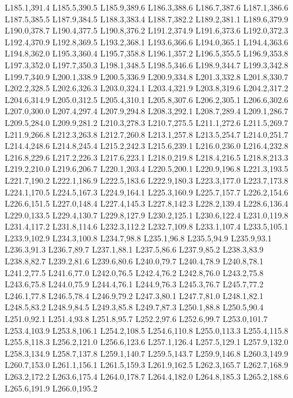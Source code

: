 		L185.1,391.4 L185.5,390.5 L185.9,389.6 L186.3,388.6 L186.7,387.6 L187.1,386.6 L187.5,385.5 L187.9,384.5
		L188.3,383.4 L188.7,382.2 L189.2,381.1 L189.6,379.9 L190.0,378.7 L190.4,377.5 L190.8,376.2 L191.2,374.9
		L191.6,373.6 L192.0,372.3 L192.4,370.9 L192.8,369.5 L193.2,368.1 L193.6,366.6 L194.0,365.1 L194.4,363.6
		L194.8,362.0 L195.3,360.4 L195.7,358.8 L196.1,357.2 L196.5,355.5 L196.9,353.8 L197.3,352.0 L197.7,350.3
		L198.1,348.5 L198.5,346.6 L198.9,344.7 L199.3,342.8 L199.7,340.9 L200.1,338.9 L200.5,336.9 L200.9,334.8
		L201.3,332.8 L201.8,330.7 L202.2,328.5 L202.6,326.3 L203.0,324.1 L203.4,321.9 L203.8,319.6 L204.2,317.2
		L204.6,314.9 L205.0,312.5 L205.4,310.1 L205.8,307.6 L206.2,305.1 L206.6,302.6 L207.0,300.0 L207.4,297.4
		L207.9,294.8 L208.3,292.1 L208.7,289.4 L209.1,286.7 L209.5,284.0 L209.9,281.2 L210.3,278.3 L210.7,275.5
		L211.1,272.6 L211.5,269.7 L211.9,266.8 L212.3,263.8 L212.7,260.8 L213.1,257.8 L213.5,254.7 L214.0,251.7
		L214.4,248.6 L214.8,245.4 L215.2,242.3 L215.6,239.1 L216.0,236.0 L216.4,232.8 L216.8,229.6 L217.2,226.3
		L217.6,223.1 L218.0,219.8 L218.4,216.5 L218.8,213.3 L219.2,210.0 L219.6,206.7 L220.1,203.4 L220.5,200.1
		L220.9,196.8 L221.3,193.5 L221.7,190.2 L222.1,186.9 L222.5,183.6 L222.9,180.3 L223.3,177.0 L223.7,173.8
		L224.1,170.5 L224.5,167.3 L224.9,164.1 L225.3,160.9 L225.7,157.7 L226.2,154.6 L226.6,151.5 L227.0,148.4
		L227.4,145.3 L227.8,142.3 L228.2,139.4 L228.6,136.4 L229.0,133.5 L229.4,130.7 L229.8,127.9 L230.2,125.1
		L230.6,122.4 L231.0,119.8 L231.4,117.2 L231.8,114.6 L232.3,112.2 L232.7,109.8 L233.1,107.4 L233.5,105.1
		L233.9,102.9 L234.3,100.8 L234.7,98.8 L235.1,96.8 L235.5,94.9 L235.9,93.1 L236.3,91.3 L236.7,89.7
		L237.1,88.1 L237.5,86.6 L237.9,85.2 L238.3,83.9 L238.8,82.7 L239.2,81.6 L239.6,80.6 L240.0,79.7
		L240.4,78.9 L240.8,78.1 L241.2,77.5 L241.6,77.0 L242.0,76.5 L242.4,76.2 L242.8,76.0 L243.2,75.8
		L243.6,75.8 L244.0,75.9 L244.4,76.1 L244.9,76.3 L245.3,76.7 L245.7,77.2 L246.1,77.8 L246.5,78.4
		L246.9,79.2 L247.3,80.1 L247.7,81.0 L248.1,82.1 L248.5,83.2 L248.9,84.5 L249.3,85.8 L249.7,87.3
		L250.1,88.8 L250.5,90.4 L251.0,92.1 L251.4,93.8 L251.8,95.7 L252.2,97.6 L252.6,99.7 L253.0,101.7
		L253.4,103.9 L253.8,106.1 L254.2,108.5 L254.6,110.8 L255.0,113.3 L255.4,115.8 L255.8,118.3 L256.2,121.0
		L256.6,123.6 L257.1,126.4 L257.5,129.1 L257.9,132.0 L258.3,134.9 L258.7,137.8 L259.1,140.7 L259.5,143.7
		L259.9,146.8 L260.3,149.9 L260.7,153.0 L261.1,156.1 L261.5,159.3 L261.9,162.5 L262.3,165.7 L262.7,168.9
		L263.2,172.2 L263.6,175.4 L264.0,178.7 L264.4,182.0 L264.8,185.3 L265.2,188.6 L265.6,191.9 L266.0,195.2
